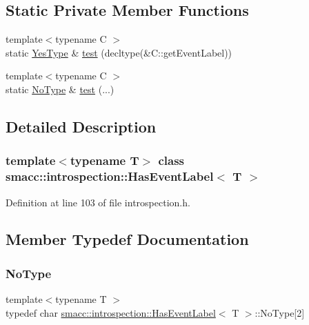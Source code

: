 \subsection*{Static Private Member Functions}
\begin{DoxyCompactItemize}
\item 
{\footnotesize template$<$typename C $>$ }\\static \hyperlink{classsmacc_1_1introspection_1_1HasEventLabel_a8d4b4c2ecb640812e11e8c1407636b6a}{Yes\+Type} \& \hyperlink{classsmacc_1_1introspection_1_1HasEventLabel_ae3239e0c7cf38f2c4f3d3210d5e418a2}{test} (decltype(\&C\+::get\+Event\+Label))
\item 
{\footnotesize template$<$typename C $>$ }\\static \hyperlink{classsmacc_1_1introspection_1_1HasEventLabel_a91b6dd8a7c59c7f24ef0937c99026e81}{No\+Type} \& \hyperlink{classsmacc_1_1introspection_1_1HasEventLabel_a8b29e9cf519f2adf6c0e8634cae63261}{test} (...)
\end{DoxyCompactItemize}


\subsection{Detailed Description}
\subsubsection*{template$<$typename T$>$\newline
class smacc\+::introspection\+::\+Has\+Event\+Label$<$ T $>$}



Definition at line 103 of file introspection.\+h.



\subsection{Member Typedef Documentation}
\mbox{\label{classsmacc_1_1introspection_1_1HasEventLabel_a91b6dd8a7c59c7f24ef0937c99026e81}} 
\subsubsection{\texorpdfstring{No\+Type}{NoType}}
{\footnotesize\ttfamily template$<$typename T $>$ \\
typedef char \hyperlink{classsmacc_1_1introspection_1_1HasEventLabel}{smacc\+::introspection\+::\+Has\+Event\+Label}$<$ T $>$\+::No\+Type\mbox{[}2\mbox{]}\hspace{0.3cm}{\ttfamily [private]}}



